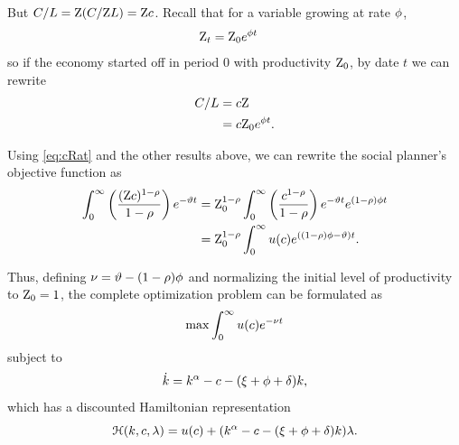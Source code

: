 \documentclass{handout}
\begin{document}
But $C/L = \mathrm{Z} (C/\mathrm{Z} L)= \mathrm{Z} c$.  Recall that for a variable growing at rate $\phi$,
\begin{equation}\begin{gathered}\begin{aligned}
  \mathrm{Z} _{t} & =  \mathrm{Z} _{0}e^{\phi t}
\end{aligned}\end{gathered}\end{equation}
so if the economy started off in period 0 with productivity $\mathrm{Z}_{0}$, by date $t$ we can rewrite
\begin{equation}\begin{gathered}\begin{aligned}
  C/L & =  c\mathrm{Z}   \\
               & =  c\mathrm{Z} _{0}e^{\phi t}. \label{eq:cRat}
\end{aligned}\end{gathered}\end{equation}

Using \eqref{eq:cRat} and the other results above, we can rewrite the social planner's objective function as
\begin{equation}\begin{gathered}\begin{aligned}
  \int_{0}^{\infty} \left(\frac{(\mathrm{Z} c)^{1-\rho}}{1-\rho}\right) e^{-\vartheta  t} & =  
                                                                                               \mathrm{Z} _{0}^{1-\rho}\int_{0}^{\infty} \left(\frac{c^{1-\rho}}{1-\rho}\right) e^{-\vartheta  t}e^{(1-\rho)\phi  t} 
  \\ & =  \mathrm{Z} _{0}^{1-\rho}\int_{0}^{\infty} u(c) e^{\left((1-\rho)\phi -\vartheta \right) t}
           .
           \label{eq:maxprobmod}
\end{aligned}\end{gathered}\end{equation}

Thus, defining $\nu = \vartheta  - (1-\rho) \phi$ and normalizing the initial
level of productivity to $\mathrm{Z} _{0}=1$, the complete optimization problem
can be formulated as
\begin{equation}
  \max \int_{0}^{\infty} u(c) e^{-\nu  t}
\end{equation}
subject to
\begin{equation}
  \dot{{k}} = {k}^{\alpha}-c-(\xi+\phi+\delta)k,
\end{equation}
which has a discounted Hamiltonian representation
\begin{equation}
  \mathcal{H}({k},c,\lambda) = u(c) + ({k}^{\alpha} - c - (\xi+\phi+\delta){k})\lambda.
\end{equation}
\end{document}
